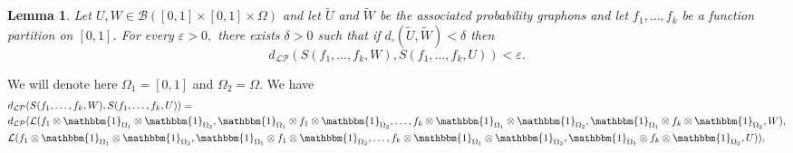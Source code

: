 \documentclass[11pt]{article}
\newtheorem{lemma}[theorem]{Lemma}
\newcommand{\cB}{{\mathcal B}}  %
\begin{document}
\begin{lemma}\label{LemmKprofBoundCutdist}
Let $U,W\in\cB([0,1]\times [0,1]\times \Omega)$ and let $\widetilde U$ and $\widetilde W$ be the associated probability graphons and let $f_1,\ldots, f_k$ be a function partition on $[0,1]$. For every $\varepsilon>0,$ there exists $\delta>0$ such that if $d_{\square}(\widetilde U,\widetilde W)<\delta$ then 
$$d_{\mathcal{LP}}(S(f_1,\ldots,f_k,W),S(f_1,\ldots,f_k,U))<\varepsilon.$$
\end{lemma}
\proof
We will denote here $\Omega_1=[0,1]$ and $\Omega_2=\Omega.$
We have
$$
\begin{aligned}
& d_{\mathcal{LP}}(S(f_1,\ldots,f_k,W),S(f_1,\ldots,f_k,U))=\\
& d_{\mathcal{LP}}(\mathcal{L}(f_1 \otimes\mathbbm{1}_{\Omega_1} \otimes \mathbbm{1}_{\Omega_2},\mathbbm{1}_{\Omega_1}\otimes f_1 \otimes\mathbbm{1}_{\Omega_2},\ldots, f_k \otimes\mathbbm{1}_{\Omega_1} \otimes \mathbbm{1}_{\Omega_2},\mathbbm{1}_{\Omega_1}\otimes f_k \otimes\mathbbm{1}_{\Omega_2},W),\\
&\mathcal{L}(f_1 \otimes\mathbbm{1}_{\Omega_1} \otimes \mathbbm{1}_{\Omega_2},\mathbbm{1}_{\Omega_1}\otimes f_1 \otimes\mathbbm{1}_{\Omega_2},\ldots, f_k \otimes\mathbbm{1}_{\Omega_1} \otimes \mathbbm{1}_{\Omega_2},\mathbbm{1}_{\Omega_1}\otimes f_k \otimes\mathbbm{1}_{\Omega_2},U)).
\end{aligned}
$$
\end{document}
